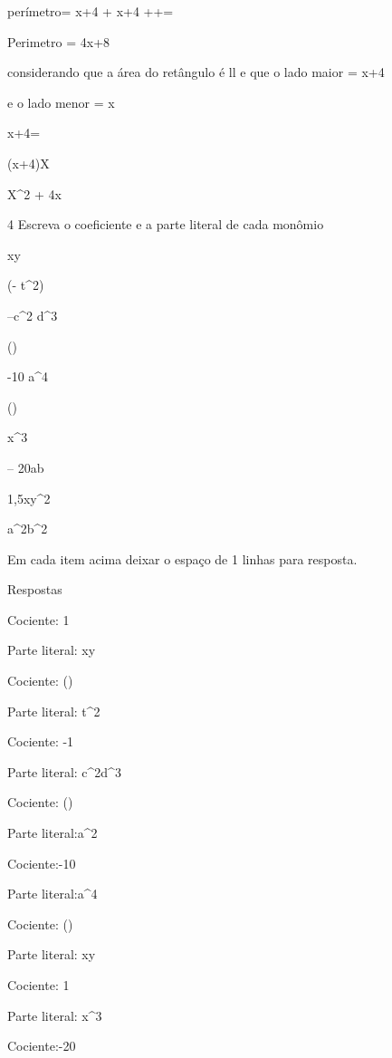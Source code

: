 perímetro= x+4 + x+4 +\times +\times =

Perimetro = 4x+8

\item considerando que a área do retângulo é l\times l e que
o lado maior = x+4

e o lado menor = x

x+4\times \times =

(x+4)\times X

X^2 + 4x

\num{4} Escreva o coeficiente e a parte literal de cada monômio

\item xy
\item (- t^2)
\item --c^2 d^3
\item ()
\item -10 a^4
\item ()
\item x^3
\item -- 20ab
\item 1,5xy^2
\item a^2b^2

Em cada item acima deixar o espaço de 1 linhas para resposta.

Respostas

\item 

Cociente: 1

Parte literal: xy

\item Cociente: ()

Parte literal: t^2

\item Cociente: -1

Parte literal: c^2d^3

\item Cociente: ()

Parte literal:a^2

\item Cociente:-10

Parte literal:a^4

\item Cociente: ()

Parte literal: xy

\item Cociente: 1

Parte literal: x^3

\item Cociente:-20

